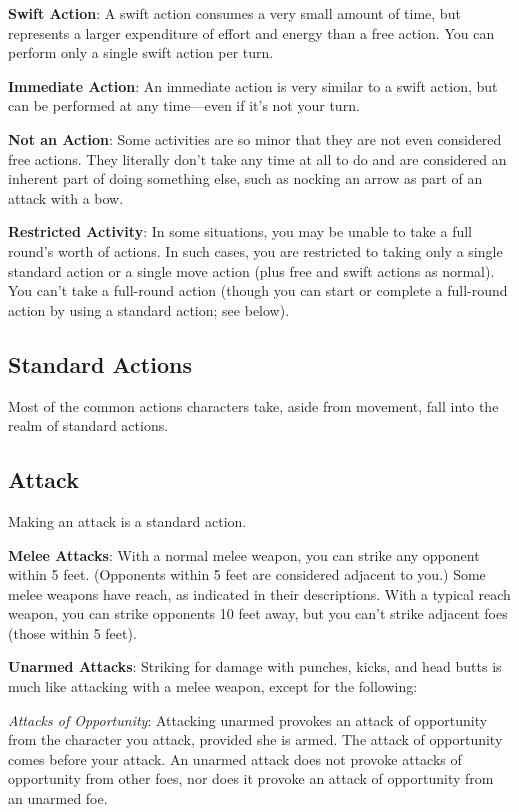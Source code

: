 \textbf{Swift Action}: A swift action consumes a very small amount of time, but represents a larger expenditure of effort and energy than a free action. You can perform only a single swift action per turn.
				
\textbf{Immediate Action}: An immediate action is very similar to a swift action, but can be performed at any time---even if it's not your turn.
				
\textbf{Not an Action}: Some activities are so minor that they are not even considered free actions. They literally don't take any time at all to do and are considered an inherent part of doing something else, such as nocking an arrow as part of an attack with a bow.
				
\textbf{Restricted Activity}: In some situations, you may be unable to take a full round's worth of actions. In such cases, you are restricted to taking only a single standard action or a single move action (plus free and swift actions as normal). You can't take a full-round action (though you can start or complete a full-round action by using a standard action; see below).
				
\subsection{Standard Actions}

				
Most of the common actions characters take, aside from movement, fall into the realm of standard actions.
				
\subsection{Attack}

				
Making an attack is a standard action.
				
\textbf{Melee Attacks}: With a normal melee weapon, you can strike any opponent within 5 feet. (Opponents within 5 feet are considered adjacent to you.) Some melee weapons have reach, as indicated in their descriptions. With a typical reach weapon, you can strike opponents 10 feet away, but you can't strike adjacent foes (those within 5 feet).
				
\textbf{Unarmed Attacks}: Striking for damage with punches, kicks, and head butts is much like attacking with a melee weapon, except for the following:
				
\textit{Attacks of Opportunity}: Attacking unarmed provokes an attack of opportunity from the character you attack, provided she is armed. The attack of opportunity comes before your attack. An unarmed attack does not provoke attacks of opportunity from other foes, nor does it provoke an attack of opportunity from an unarmed foe.
				

